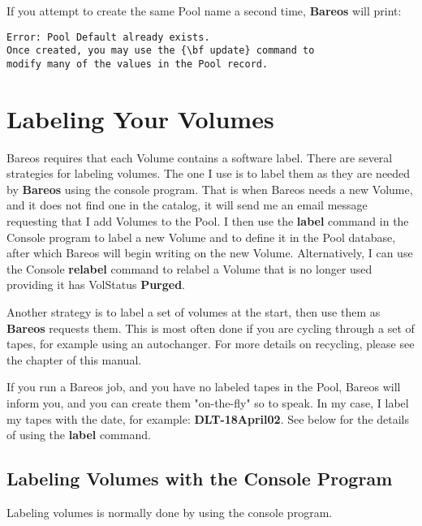 If you attempt to create the same Pool name a second time, {\bf Bareos} will
print:

\footnotesize
\begin{verbatim}
Error: Pool Default already exists.
Once created, you may use the {\bf update} command to
modify many of the values in the Pool record.
\end{verbatim}
\normalsize


\section{Labeling Your Volumes}
\label{Labeling}

Bareos requires that each Volume contains a software label. There are several
strategies for labeling volumes. The one I use is to label them as they are
needed by {\bf Bareos} using the console program. That is when Bareos needs a
new Volume, and it does not find one in the catalog, it will send me an email
message requesting that I add Volumes to the Pool. I then use the {\bf label}
command in the Console program to label a new Volume and to define it in the
Pool database, after which Bareos will begin writing on the new Volume.
Alternatively, I can use the Console {\bf relabel} command to relabel a Volume
that is no longer used providing it has VolStatus {\bf Purged}.

Another strategy is to label a set of volumes at the start, then use them as
{\bf Bareos} requests them. This is most often done if you are cycling through
a set of tapes, for example using an autochanger. For more details on
recycling, please see the
 chapter of
this manual.

If you run a Bareos job, and you have no labeled tapes in the Pool, Bareos
will inform you, and you can create them "on-the-fly" so to speak. In my
case, I label my tapes with the date, for example: {\bf DLT-18April02}. See
below for the details of using the {\bf label} command.

\subsection{Labeling Volumes with the Console Program}

Labeling volumes is normally done by using the console program.

